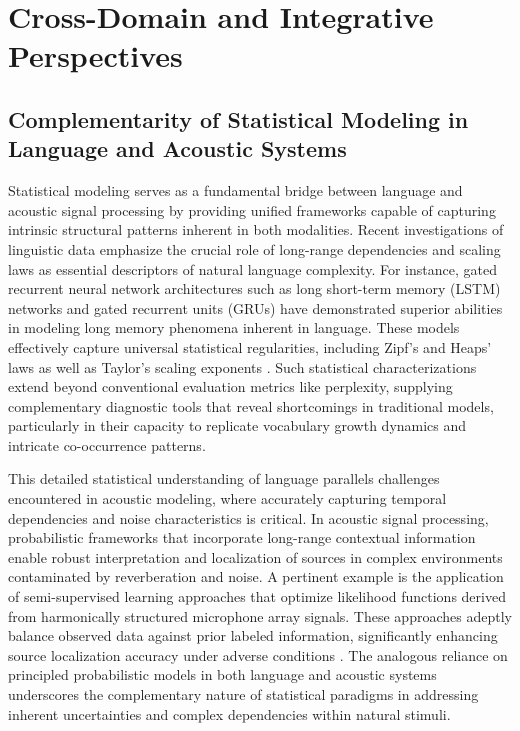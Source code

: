 \section{Cross-Domain and Integrative Perspectives}

\subsection{Complementarity of Statistical Modeling in Language and Acoustic Systems}

Statistical modeling serves as a fundamental bridge between language and acoustic signal processing by providing unified frameworks capable of capturing intrinsic structural patterns inherent in both modalities. Recent investigations of linguistic data emphasize the crucial role of long-range dependencies and scaling laws as essential descriptors of natural language complexity. For instance, gated recurrent neural network architectures such as long short-term memory (LSTM) networks and gated recurrent units (GRUs) have demonstrated superior abilities in modeling long memory phenomena inherent in language. These models effectively capture universal statistical regularities, including Zipf’s and Heaps’ laws as well as Taylor’s scaling exponents \cite{ref51}. Such statistical characterizations extend beyond conventional evaluation metrics like perplexity, supplying complementary diagnostic tools that reveal shortcomings in traditional models, particularly in their capacity to replicate vocabulary growth dynamics and intricate co-occurrence patterns.

This detailed statistical understanding of language parallels challenges encountered in acoustic modeling, where accurately capturing temporal dependencies and noise characteristics is critical. In acoustic signal processing, probabilistic frameworks that incorporate long-range contextual information enable robust interpretation and localization of sources in complex environments contaminated by reverberation and noise. A pertinent example is the application of semi-supervised learning approaches that optimize likelihood functions derived from harmonically structured microphone array signals. These approaches adeptly balance observed data against prior labeled information, significantly enhancing source localization accuracy under adverse conditions \cite{ref52}. The analogous reliance on principled probabilistic models in both language and acoustic systems underscores the complementary nature of statistical paradigms in addressing inherent uncertainties and complex dependencies within natural stimuli.

